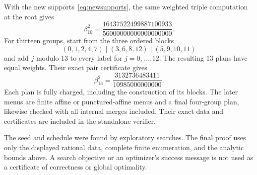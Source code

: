 With the new supports~\eqref{eq:newsupports}, the same weighted triple
computation at the root gives
\begin{equation}\label{eq:newtriple}
 \beta_{10}^2
 =\frac{16437522499887100933}{56000000000000000000}.
\end{equation}
For thirteen groups, start from the three ordered blocks
\[
 (0,1,2,4,7)\mid(3,6,8,12)\mid(5,9,10,11)
\]
and add $j$ modulo 13 to every label for $j=0,\ldots,12$. The resulting
13 plans have equal weights. Their exact pair certificate gives
\begin{equation}\label{eq:cyclic13}
 \beta_{13}^2=\frac{3132736483411}{10985000000000}.
\end{equation}
Each plan is fully charged, including the construction of its blocks.
The later menus are finite affine or punctured-affine menus and a final
four-group plan, likewise checked with all internal merges included.
Their exact data and certificates are included in the standalone verifier.

The seed and schedule were found by exploratory searches. The final proof
uses only the displayed rational data, complete finite enumeration, and
the analytic bounds above. A search objective or an optimizer's success
message is not used as a certificate of correctness or global optimality.
